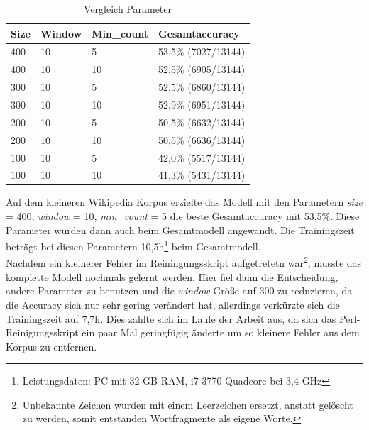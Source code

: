 \documentclass[12pt,a4paper]{report}
\begin{document}
\begin{table}[h]
\label{tab:VergleichParameter}
\caption{Vergleich Parameter}
\begin{center}
\begin{tabular}{l|l|l|l}
\textbf{Size} & \textbf{Window} & \textbf{Min\_count} & \textbf{Gesamtaccuracy}\\
\hline	
400 & 10 &  5 & 53,5\% (7027/13144)\\
400 & 10 & 10 & 52,5\% (6905/13144)\\
300 & 10 &  5 & 52,5\% (6860/13144)\\
300 & 10 & 10 & 52,9\% (6951/13144)\\
200 & 10 &  5 & 50,5\% (6632/13144)\\
200 & 10 & 10 & 50,5\% (6636/13144)\\
100 & 10 &  5 & 42,0\% (5517/13144)\\
100 & 10 & 10 & 41,3\% (5431/13144)\\

\end{tabular}
\end{center}
\end{table}

Auf dem kleineren Wikipedia Korpus erzielte das Modell mit den Parametern 
\textit{size} = 400, \textit{window} = 10, \textit{min\_count} = 5
 die beste Gesamtaccuracy mit 53,5\%. Diese Parameter wurden dann auch beim Gesamtmodell angewandt. Die Trainingszeit beträgt bei diesen Parametern 10,5h\footnote{Leistungsdaten: PC mit 32 GB RAM, i7-3770 Quadcore bei 3,4 GHz} beim Gesamtmodell.\\
Nachdem ein kleinerer Fehler im Reiningungsskript aufgetretetn war\footnote{Unbekannte Zeichen wurden mit einem Leerzeichen ersetzt, anstatt gelöscht zu werden, somit entstanden Wortfragmente als eigene Worte.}, musste das komplette Modell nochmals gelernt werden. Hier fiel dann die Entscheidung, andere Parameter zu benutzen und die \textit{window} Größe auf 300 zu reduzieren, da die Accuracy sich nur sehr gering verändert hat, allerdings verkürzte sich die Trainingszeit auf 7,7h. Dies zahlte sich im Laufe der Arbeit aus, da sich das Perl-Reinigungsskript ein paar Mal geringfügig änderte um so kleinere Fehler aus dem Korpus zu entfernen.\\


	
\end{document}
